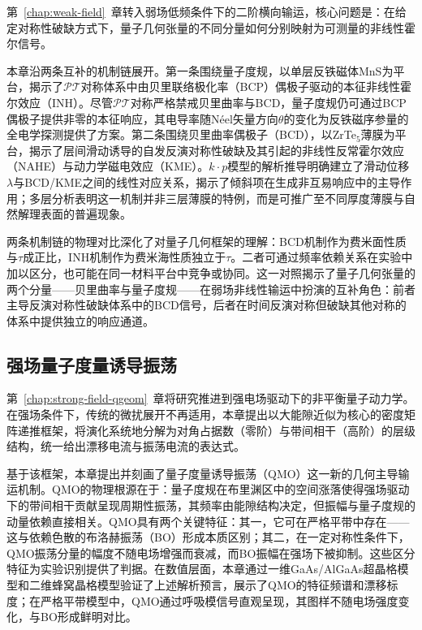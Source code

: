 第~\ref{chap:weak-field}~章转入弱场低频条件下的二阶横向输运，核心问题是：在给定对称性破缺方式下，量子几何张量的不同分量如何分别映射为可测量的非线性霍尔信号。

本章沿两条互补的机制链展开。第一条围绕量子度规，以单层反铁磁体MnS为平台，揭示了$\mathcal{PT}$对称体系中由贝里联络极化率（BCP）偶极子驱动的本征非线性霍尔效应（INH）\cite{PhysRevLett.131.056401}。尽管$\mathcal{PT}$对称严格禁戒贝里曲率与BCD，量子度规仍可通过BCP偶极子提供非零的本征响应，其电导率随Néel矢量方向$\theta$的变化为反铁磁序参量的全电学探测提供了方案。第二条围绕贝里曲率偶极子（BCD），以ZrTe$_5$薄膜为平台，揭示了层间滑动诱导的自发反演对称性破缺及其引起的非线性反常霍尔效应（NAHE）与动力学磁电效应（KME）\cite{nsr_nwad103}。$k\cdot p$模型的解析推导明确建立了滑动位移$\lambda$与BCD/KME之间的线性对应关系，揭示了倾斜项在生成非互易响应中的主导作用；多层分析表明这一机制并非三层薄膜的特例，而是可推广至不同厚度薄膜与自然解理表面的普遍现象。

两条机制链的物理对比深化了对量子几何框架的理解：BCD机制作为费米面性质与$\tau$成正比，INH机制作为费米海性质独立于$\tau$。二者可通过频率依赖关系在实验中加以区分，也可能在同一材料平台中竞争或协同。这一对照揭示了量子几何张量的两个分量——贝里曲率与量子度规——在弱场非线性输运中扮演的互补角色：前者主导反演对称性破缺体系中的BCD信号，后者在时间反演对称但破缺其他对称的体系中提供独立的响应通道。

\subsection{强场量子度量诱导振荡}

第~\ref{chap:strong-field-qgeom}~章将研究推进到强电场驱动下的非平衡量子动力学。在强场条件下，传统的微扰展开不再适用，本章提出以大能隙近似为核心的密度矩阵递推框架，将演化系统地分解为对角占据数（零阶）与带间相干（高阶）的层级结构，统一给出漂移电流与振荡电流的表达式。

基于该框架，本章提出并刻画了量子度量诱导振荡（QMO）这一新的几何主导输运机制。QMO的物理根源在于：量子度规在布里渊区中的空间涨落使得强场驱动下的带间相干贡献呈现周期性振荡，其频率由能隙结构决定，但振幅与量子度规的动量依赖直接相关。QMO具有两个关键特征：其一，它可在严格平带中存在——这与依赖色散的布洛赫振荡（BO）形成本质区别；其二，在一定对称性条件下，QMO振荡分量的幅度不随电场增强而衰减，而BO振幅在强场下被抑制。这些区分特征为实验识别提供了判据。在数值层面，本章通过一维GaAs/AlGaAs超晶格模型和二维蜂窝晶格模型验证了上述解析预言，展示了QMO的特征频谱和漂移标度；在严格平带模型中，QMO通过呼吸模信号直观呈现，其图样不随电场强度变化，与BO形成鲜明对比。

